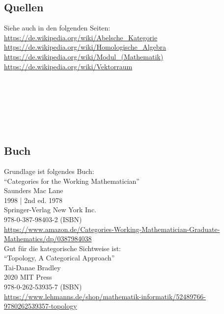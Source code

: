 \documentclass[a4paper]{amsart}
\theoremstyle{definition}
\begin{document}
\subsection*{Quellen}
Siehe auch in den folgenden Seiten:\\
\url{https://de.wikipedia.org/wiki/Abelsche_Kategorie}\\
\url{https://de.wikipedia.org/wiki/Homologische_Algebra}\\
\url{https://de.wikipedia.org/wiki/Modul_(Mathematik)}\\
\url{https://de.wikipedia.org/wiki/Vektorraum}\\
\url{}\\
\url{}\\
\url{}\\
\url{}\\
\url{}\\
\url{}\\


\subsection*{Buch}
Grundlage ist folgendes Buch:\\
"`Categories for the Working Mathematician"'\\
Saunders Mac Lane\\
1998 | 2nd ed. 1978\\
Springer-Verlag New York Inc.\\
978-0-387-98403-2 (ISBN)\\
{\tiny
   \url{https://www.amazon.de/Categories-Working-Mathematician-Graduate-Mathematics/dp/0387984038}}\\

Gut für die kategorische Sichtweise ist:\\
"`Topology, A Categorical Approach"'\\
Tai-Danae Bradley\\
2020 MIT Press\\
978-0-262-53935-7 (ISBN)\\
{\tiny
\url{https://www.lehmanns.de/shop/mathematik-informatik/52489766-9780262539357-topology}}\\
\end{document}
